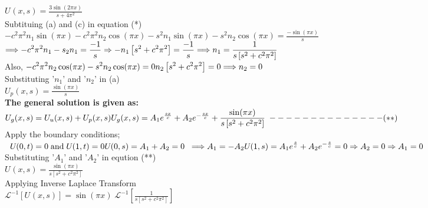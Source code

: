 \documentclass[a4paper 11pt]{article}
\newcommand{\Laplace}{\mathcal{L}}
\newcommand{\sbracket}[1]{\left[#1\right]}
\newcommand{\Un}[2]{U_{#1}(#2)}
\newcommand{\NI}{\noindent}
\newcommand{\psq}{\pi^{2}}
\newcommand{\InverseL}[1]{\Laplace^{-1}\left[#1\right]}
\begin{document}
\NI ${\displaystyle \Un{}{x,s} = \frac{3\sin(2\pi x)}{s + 4\pi^{2}}}$\\[0.5cm]

\NI Subtituing (a) and (c) in equation (*)\\
${\displaystyle -c^{2}\psq n_{1}\sin(\pi x) - c^{2}\psq n_{2}\cos(\pi x) - s^{2}n_{1}\sin(\pi x) -  s^{2}n_{2}\cos(\pi x) = \frac{-\sin(\pi x)}{s}}$\\[0.2cm]
$ \Longrightarrow \displaystyle -c^{2}\psq n_{1} - s_{2}n_{1}  = \frac{-1}{s} \Rightarrow -n_{1}\left[s^{2} + c^{2}\psq \right] = \frac{-1}{s} \\ 
\Longrightarrow n_{1} = \frac{1}{s\left[s^{2} + c^{2}\psq \right]}
$\\[0.2cm]

\NI Also, 
$
\displaystyle -c^{2}\psq n_{2}\cos(\pi x) - s^{2}n_{2}\cos(\pi x) = 0 \\[0.2cm]
n_2\left[s^{2} + c^{2}\psq \right] = 0 \\[0.2cm] 
\Longrightarrow n_{2} = 0 \\
$\\[0.2cm]

\NI Substituting '$n_{1}$' and '$n_{2}$' in (a)\\[0.2cm]
$ \displaystyle
\Un{p}{x,s} = \frac{\sin(\pi x)}{s}
$\\[0.2cm]

\NI \textbf{The general solution is given as:}\\[0.2cm]
$\displaystyle
\Un{g}{x,s} = \Un{u}{x,s} + \Un{p}{x,s} \\[0.2cm]
\Un{g}{x,s} = A_{1}e^{\frac{sx}{c}} + A_{2}e^{-\frac{sx}{c}} + \frac{\sin(\pi x)}{s\left[ s^{2} + c^{2}\psq \right]} \; - - - - - - - - - - - - - - (**)
$\\[0.2cm]

\NI Apply the boundary conditions;
$\displaystyle
\; \; \Un{}{0,t} = 0 \; \text{and} \; \Un{}{1,t} = 0 \\[0.2cm]
\Un{}{0,s} = A_1 + A_2 = 0 \; \; \Longrightarrow A_1 = - A_2 \\[0.1cm]
\Un{}{1,s} = A_1 e^{\frac{s}{c}} + A_2 e^{- \frac{s}{c}} = 0 \Rightarrow A_2 = 0 \Rightarrow A_1 = 0
$\\[0.3cm]

\NI Substituting '$A_1$' and '$A_2$' in eqution (**) \\[0.2cm]
$\displaystyle
\Un{}{x,s} = \frac{\sin(\pi x)}{s \left[s^{2} + c^{2}\psq \right]}
$\\[1cm]

\NI Applying Inverse Laplace Transform \\[0.2cm]
$\displaystyle
\InverseL{\Un{}{x,s}} = \sin(\pi x) \; \InverseL{\frac{1}{s\sbracket{s^{2} + c^{2}\psq}}}
$\\[0.3cm]
\end{document}
